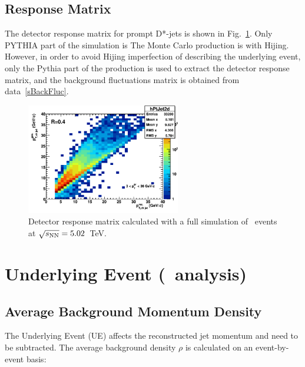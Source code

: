 \subsection{Response Matrix}
\label{Det_Resp}

The detector response matrix for prompt D*-jets is shown in Fig.~\ref{fRMdet_pPb}. Only PYTHIA part of the simulation is 
The Monte Carlo production is with Hijing. However, in order to avoid Hijing imperfection of describing the underlying event, only the Pythia part of the production is used to extract the detector response matrix, and the background fluctuations matrix is obtained from data~\ref{sBackFluc}.

\begin{figure}[bth]
\centering
\includegraphics[width=0.6\textwidth]{pPbplots/ResponseMatrix/DetMatrix_Dpt3_36}
\caption{Detector response matrix calculated with a full simulation of \pPb\ events at $\sqrt{s_{\rm NN}}=5.02$~TeV.}
\label{fRMdet_pPb}
\end{figure}


\section{Underlying Event (\pPb\ analysis)}
\subsection{Average Background Momentum Density}
\label{sBackSub}

The Underlying Event (UE) affects the reconstructed jet momentum and need to be subtracted.
The average background density $\rho$ is calculated on an event-by-event basis:

